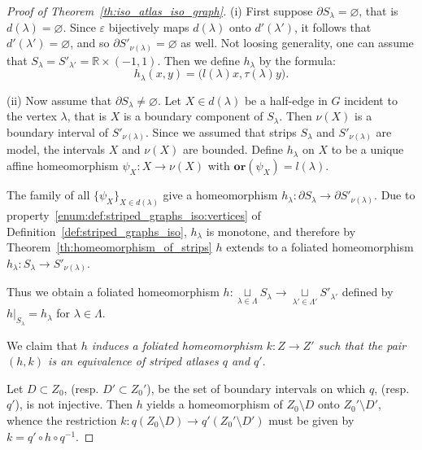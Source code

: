 \documentclass[12pt, reqno]{amsart}
\newcommand{\bR}{\mathbb{R}}
\newcommand\dif{h}
\newcommand{\strip}{S}
\newcommand{\stripSurf}{Z}
\newcommand{\preStripSurf}{\stripSurf_0}
\newcommand{\bdX}{X}
\newcommand{\stInd}{{\lambda}}
\newcommand{\StInd}{\Lambda}
\newcommand{\qmap}{q}
\newcommand\Gr{G}
\newcommand\ori{\mathbf{or}}
\newcommand\lori{l}
\newcommand\tori{\tau}
\newcommand\eiso{\varepsilon}
\newcommand\viso{\nu}
\begin{document}
\begin{proof}[Proof of Theorem~\ref{th:iso_atlas_iso_graph}]
(i) First suppose $\partial\strip_{\stInd}=\varnothing$, that is $d(\stInd)=\varnothing$.
Since $\eiso$ bijectively maps $d(\stInd)$ onto $d'(\stInd')$, it follows that $d'(\stInd')=\varnothing$, and so $\partial\strip'_{\nu(\stInd)}=\varnothing$ as well.
Not loosing generality, one can assume that $\strip_{\stInd}=\strip'_{\stInd'}=\bR\times(-1,1)$.
Then we define $\dif_{\stInd}$ by the formula:
\[
\dif_{\stInd}(x,y) = \bigl( \lori(\stInd) x, \tori(\stInd) y ).
\]

(ii) Now assume that $\partial\strip_{\stInd}\not=\varnothing$.
Let $\bdX \in d(\stInd)$ be a half-edge in $\Gr$ incident to the vertex $\stInd$, that is $\bdX$ is a boundary component of $\strip_{\stInd}$.
Then $\viso(\bdX)$ is a boundary interval of $\strip'_{\viso(\stInd)}$.
Since we assumed that strips $\strip_{\stInd}$ and $\strip'_{\viso(\stInd)}$ are model, the intervals $\bdX$ and $\viso(\bdX)$ are bounded.
Define $\dif_{\stInd}$ on $\bdX$ to be a unique affine homeomorphism $\psi_{\bdX}:\bdX \to \viso(\bdX)$ with $\ori(\psi_{\bdX}) = \lori(\stInd)$.


The family of all $\{\psi_{\bdX}\}_{\bdX\in d(\stInd)}$ give a homeomorphism $\dif_{\stInd}:\partial\strip_{\stInd} \to \partial\strip'_{\viso(\stInd)}$.
Due to property~\ref{enum:def:striped_graphs_iso:vertices} of Definition~\ref{def:striped_graphs_iso}, $\dif_{\stInd}$ is monotone, and therefore by Theorem~\ref{th:homeomorphism_of_strips} $\dif$ extends to a foliated homeomorphism $\dif_{\stInd}:\strip_{\stInd} \to \strip'_{\viso(\stInd)}$.

Thus we obtain a foliated homeomorphism 
$\dif: \mathop{\sqcup}\limits_{\stInd\in\StInd}\strip_{\stInd} \to \mathop{\sqcup}\limits_{\stInd'\in\StInd'}\strip'_{\stInd'}$
defined by $\dif|_{\strip_{\stInd}} = \dif_{\stInd}$ for $\stInd\in\StInd$.

We claim that \textit{$\dif$ induces a foliated homeomorphism $k:\stripSurf\to \stripSurf'$ such that the pair $(\dif,k)$ is an equivalence of striped atlases $\qmap$ and $\qmap'$}.

Let $D \subset \preStripSurf$, (resp. $D' \subset \preStripSurf'$), be the set of boundary intervals on which $\qmap$, (resp. $\qmap'$), is not injective.
Then $\dif$ yields a homeomorphism of $\preStripSurf\setminus D$ onto $\preStripSurf'\setminus D'$, whence the restriction $k:\qmap(\preStripSurf\setminus D) \to \qmap'(\preStripSurf'\setminus D')$ must be given by $k = \qmap' \circ \dif\circ\qmap^{-1}$.


\end{proof}
\end{document}

